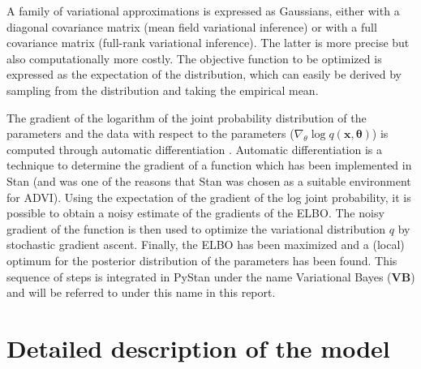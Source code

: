  A family of variational approximations is expressed as Gaussians, either with a diagonal covariance matrix (mean field variational inference) or with a full covariance matrix (full-rank variational inference). The latter is more precise but also computationally more costly. 
The objective function to be optimized is expressed as the expectation of the distribution, which can easily be derived by sampling from the distribution and taking the empirical mean.
 
 The gradient of the logarithm of the joint probability distribution of the parameters and the data with respect to the parameters ($\nabla_\theta \log{q(\bm{x},\bm{\theta})}$) is computed through automatic differentiation \cite{baydin2017automatic}. Automatic differentiation is a technique to determine the gradient of a function which has been implemented in Stan (and was one of the reasons that Stan was chosen as a suitable environment for ADVI).
 Using the expectation of the gradient of the log joint probability, it is possible to obtain a noisy estimate of the gradients of the ELBO.
 The noisy gradient of the function is then used to optimize the variational distribution $q$ by stochastic gradient ascent. Finally, the ELBO has been maximized and a (local) optimum for the posterior distribution of the parameters has been found. This sequence of steps is integrated in PyStan under the name Variational Bayes (\textbf{VB}) and will be referred to under this name in this report.
 
 
 \section{Detailed description of the model}\label{sec:mode}
